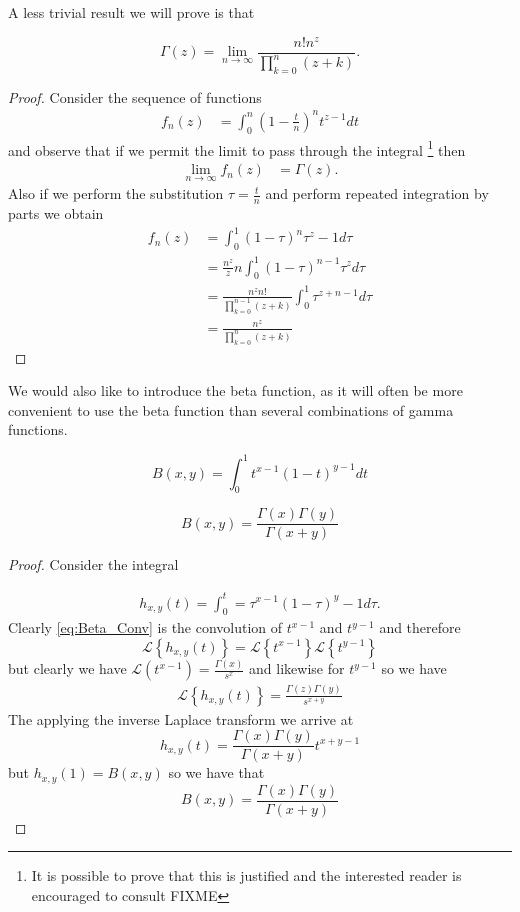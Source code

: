 \documentclass{unswmaths}
\begin{document}
A less trivial result we will prove is that
\begin{unswprp}
	$$ \Gamma(z) = \lim_{n \longrightarrow \infty} \frac{n!n^z}{\prod_{k=0}^n (z+k)}. $$
\end{unswprp}
\begin{proof}
	Consider the sequence of functions 
	\begin{align*}
		f_n(z)  	&= \int_0^n \left( 1 - \frac{t}{n} \right)^n t^{z-1} dt
	\end{align*}
	and observe that if we permit the limit to pass through the integral 
	\footnote{It is possible to prove that this is justified and the interested reader is encouraged to
	consult FIXME 
} then
	\begin{align*}
		\lim_{n \longrightarrow \infty}f_n(z) &= \Gamma(z).
	\end{align*}
	Also if we perform the substitution $ \tau = \frac{t}{n} $ and perform repeated integration by parts
	we obtain 
	\begin{align*}
		f_n(z) 	&= \int_0^1(1 - \tau)^n\tau^z-1 d\tau \\
			&= \frac{n^z}{z} n \int_0^1 (1-\tau)^{n-1}\tau ^z d\tau \\
			&= \frac{n^z n!}{\prod_{k=0}^{n - 1} (z+k)} \int_0^1\tau^{z+n-1}d\tau \\
			&= \frac{n^z}{\prod_{k=0}^{n}(z+k)}
	\end{align*}
	
\end{proof}

We would also like to introduce the beta function, as it will often be more convenient to use the beta function than
several combinations of gamma functions.

$$ B(x,y) = \int_0^1 t^{x-1}(1-t)^{y-1} dt $$

\begin{unswprp}
	$$ B(x,y) = \frac{\Gamma(x)\Gamma(y)}{\Gamma(x+y)} $$
\end{unswprp}
\begin{proof}
	Consider the integral

	\begin{align}
		\label{eq:Beta_Conv}
		h_{x,y}(t) = \int_0^t = \tau^{x-1}(1-\tau)^y-1 d\tau.
	\end{align}
	Clearly \eqref{eq:Beta_Conv} is the convolution of $ t^{x-1} $ and $ t^{y-1} $ and therefore
	$$ \mathcal{L}\left\{h_{x,y}(t)\right\} = \mathcal{L}\left\{t^{x-1}\right\} \mathcal{L}\left\{t^{y-1}\right\} $$
	but clearly we have $ \mathcal{L}(t^{x-1}) = \frac{\Gamma(x)}{s^x} $ and likewise for $ t^{y-1} $ so we have
	\begin{align*}
		\mathcal{L}\left\{ h_{x,y}(t) \right\} = \frac{\Gamma(z)\Gamma(y)}{s^{x+y}}
	\end{align*}
	The applying the inverse Laplace transform we arrive at
	$$ h_{x,y}(t) = \frac{\Gamma(x)\Gamma(y)}{\Gamma(x+y)}t^{x+y-1} $$
	but $ h_{x,y}(1) = B(x,y) $ so we have that
	$$
		B(x,y) = \frac{\Gamma(x)\Gamma(y)}{\Gamma(x+y)}
	$$
\end{proof}
\end{document}
